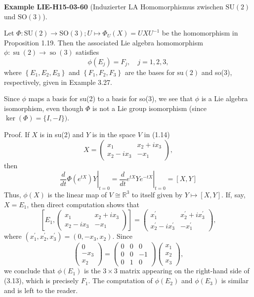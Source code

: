 \documentclass[10pt, letterpaper]{article}
\newcommand{\SO}{\mathrm{SO}}
\newcommand{\SU}{\mathrm{SU}}
\newcommand{\CustomHeading}[3]{%
  \par\medskip\noindent%
  \textbf{#1 #2} \textnormal{(#3)}.\enskip%
}
\newenvironment{EXA}[2]{\CustomHeading{Example}{#1}{#2}}{}
\begin{document}
\begin{EXA}{LIE-H15-03-60}{Induzierter LA Homomorphismus zwischen $\SU(2)$ und $\SO(3)$}
Let $\Phi: \mathrm{SU}(2) \rightarrow \mathrm{SO}(3); U\mapsto \Phi_{U}(X)=U X U^{-1}$ be the homomorphism in Proposition 1.19. Then the associated Lie algebra homomorphism $\phi: \operatorname{su}(2) \rightarrow \operatorname{so}(3)$ satisfies
$$
\phi\left(E_{j}\right)=F_{j}, \quad j=1,2,3,
$$
where $\left\{E_{1}, E_{2}, E_{3}\right\}$ and $\left\{F_{1}, F_{2}, F_{3}\right\}$ are the bases for $\mathrm{su}(2)$ and so(3), respectively, given in Example 3.27.

Since $\phi$ maps a basis for su(2) to a basis for so(3), we see that $\phi$ is a Lie algebra isomorphism, even though $\Phi$ is not a Lie group isomorphism (since $\operatorname{ker}(\Phi)=\{I,-I\})$.

Proof. If $X$ is in su(2) and $Y$ is in the space $V$ in (1.14)
$$
X=\left(\begin{array}{cc}
x_{1} & x_{2}+i x_{3} \\
x_{2}-i x_{3} & -x_{1}
\end{array}\right),
$$
then
$$
\left.\frac{d}{d t} \Phi\left(e^{t X}\right) Y\right|_{t=0}=\left.\frac{d}{d t} e^{t X} Y e^{-t X}\right|_{t=0}=[X, Y]
$$
Thus, $\phi(X)$ is the linear map of $V \cong \mathbb{R}^{3}$ to itself given by $Y \mapsto[X, Y]$. If, say, $X=E_{1}$, then direct computation shows that
$$
\left[E_{1},\left(\begin{array}{cc}
x_{1} & x_{2}+i x_{3} \\
x_{2}-i x_{3} & -x_{1}
\end{array}\right)\right]=\left(\begin{array}{cc}
x_{1}^{\prime} & x_{2}^{\prime}+i x_{3}^{\prime} \\
x_{2}^{\prime}-i x_{3}^{\prime} & -x_{1}^{\prime}
\end{array}\right),
$$
where $\left(x_{1}^{\prime}, x_{2}^{\prime}, x_{3}^{\prime}\right)=\left(0,-x_{3}, x_{2}\right)$. Since
$$
\left(\begin{array}{c}
0 \\
-x_{3} \\
x_{2}
\end{array}\right)=\left(\begin{array}{rrr}
0 & 0 & 0 \\
0 & 0 & -1 \\
0 & 1 & 0
\end{array}\right)\left(\begin{array}{l}
x_{1} \\
x_{2} \\
x_{3}
\end{array}\right),
$$
we conclude that $\phi\left(E_{1}\right)$ is the $3 \times 3$ matrix appearing on the right-hand side of (3.13), which is precisely $F_{1}$. The computation of $\phi\left(E_{2}\right)$ and $\phi\left(E_{3}\right)$ is similar and is left to the reader.
\end{EXA}
\end{document}
